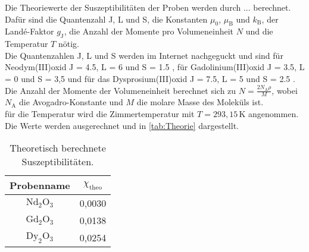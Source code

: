 Die Theoriewerte der Suszeptibilitäten der Proben werden durch ... berechnet. Dafür sind
die Quantenzahl J, L und S, die Konstanten $\mu_0$, $\mu_{\mathrm{B}}$ 
und $k_{\mathrm{B}}$, der Landé-Faktor $g_{\mathrm{J}}$, die Anzahl der Momente pro 
Volumeneinheit $N$ und die Temperatur $T$ nötig.\\
Die Quantenzahlen J, L und S werden im Internet nachgeguckt und sind für Neodym(III)oxid 
J = 4.5, L = 6 und S = 1.5 \cite{Nd}, für Gadolinium(III)oxid J = 3.5, L = 0 und S = 3,5 
und für das Dysprosium(III)oxid J = 7.5, L = 5 und S = 2.5 \cite{DyGd}.\\
Die Anzahl der Momente der Volumeneinheit berechnet sich zu $N = \frac{2 N_{\mathrm{A}} \rho }{M}$,
wobei $N_{\mathrm{A}}$ die Avogadro-Konstante und $M$ die molare Masse des Moleküls ist.\\
für die Temperatur wird die Zimmertemperatur mit $T = 293,15 \, \si{\kelvin}$ angenommen.\\
Die Werte werden ausgerechnet und in \autoref{tab:Theorie} dargestellt.

\begin{table}
  \centering
  \caption{Theoretisch berechnete Suszeptibilitäten.}
  \label{tab:Theorie}
  \begin{tabular}{c || c }
    \toprule
    Probenname & $\chi_{\mathrm{theo}}$ \\
    \hline
    $\mathrm{Nd}_2 \mathrm{O}_3$ & 0,0030 \\
    $\mathrm{Gd}_2 \mathrm{O}_3$ & 0,0138 \\
    $\mathrm{Dy}_2 \mathrm{O}_3$ & 0,0254 \\
    \midrule
    \bottomrule
  \end{tabular}
\end{table}

